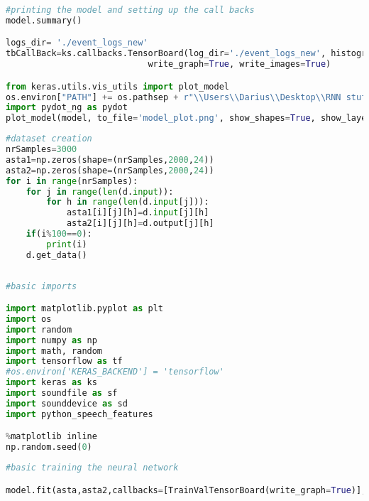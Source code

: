 \begin{lstlisting}[language=Python, label=lst:summary]
#printing the model and setting up the call backs
model.summary()

logs_dir= './event_logs_new'
tbCallBack=ks.callbacks.TensorBoard(log_dir='./event_logs_new', histogram_freq=0,
                            write_graph=True, write_images=True)

from keras.utils.vis_utils import plot_model
os.environ["PATH"] += os.pathsep + r"\\Users\\Darius\\Desktop\\RNN stuff\\graphviz\\"
import pydot_ng as pydot
plot_model(model, to_file='model_plot.png', show_shapes=True, show_layer_names=True)

\end{lstlisting}

\begin{lstlisting}[language=Python, label=lst:datasetcreation]
#dataset creation
nrSamples=3000
asta1=np.zeros(shape=(nrSamples,2000,24))
asta2=np.zeros(shape=(nrSamples,2000,24))
for i in range(nrSamples):
    for j in range(len(d.input)):
        for h in range(len(d.input[j])):
            asta1[i][j][h]=d.input[j][h]
            asta2[i][j][h]=d.output[j][h]
    if(i%100==0):
        print(i)
    d.get_data()
            
\end{lstlisting}

\begin{lstlisting}[language=Python, label=lst:imports]
#basic imports

import matplotlib.pyplot as plt
import os
import random
import numpy as np
import math, random
import tensorflow as tf
#os.environ['KERAS_BACKEND'] = 'tensorflow'
import keras as ks
import soundfile as sf
import sounddevice as sd
import python_speech_features

%matplotlib inline
np.random.seed(0)
\end{lstlisting}

\begin{lstlisting}[language=Python, label=lst:training]
#basic training the neural network

model.fit(asta,asta2,callbacks=[TrainValTensorBoard(write_graph=True)],epochs=60,batch_size=20,validation_data=(valid1,valid2))
\end{lstlisting}

